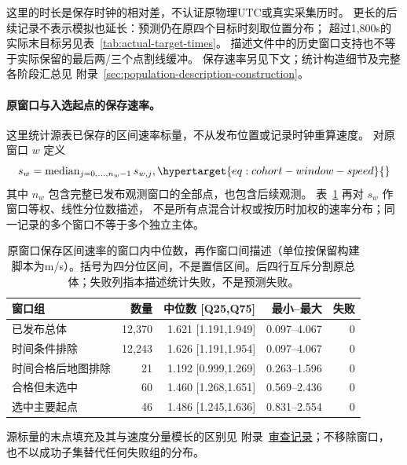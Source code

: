这里的时长是保存时钟的相对差，不认证原物理UTC或真实采集历时。
更长的后续记录不表示模拟也延长：预测仍在原四个目标时刻取位置分布；
超过1,800s的实际末目标另见表~\ref{tab:actual-target-times}。
描述文件中的历史窗口支持也不等于实际保留的最后两/三个点割线缓冲。
保存速率另见下文；统计构造细节及完整各阶段汇总见
附录~\ref{sec:population-description-construction}。

\paragraph{原窗口与入选起点的保存速率。}\label{sec:final-cohort-speeds}\hypertarget{sec:final-cohort-speeds}{}
这里统计源表已保存的区间速率标量，不从发布位置或记录时钟重算速度。
对原窗口 $w$ 定义
\begin{equation}
 s_w=\operatorname{median}_{j=0,\ldots,n_w-1}s_{w,j},
 \label{eq:cohort-window-speed}\hypertarget{eq:cohort-window-speed}{}
\end{equation}
其中 $n_w$ 包含完整已发布观测窗口的全部点，也包含后续观测。
表~\ref{tab:final-cohort-speeds} 再对 $s_w$ 作窗口等权、线性分位数描述，
不是所有点混合计权或按历时加权的速率分布；同一记录的多个窗口不等于多个独立主体。

\begin{table}[htbp]
\centering\small
\caption{原窗口保存区间速率的窗口内中位数，再作窗口间描述（单位按保留构建脚本为m/s）。括号为四分位区间，不是置信区间。后四行互斥分割原总体；失败列指本描述统计失败，不是预测失败。}
\label{tab:final-cohort-speeds}\hypertarget{tab:final-cohort-speeds}{}
\begin{tabular}{@{}lrrrr@{}}
\toprule
窗口组 & 数量 & 中位数 [Q25,Q75] & 最小--最大 & 失败\\
\midrule
已发布总体 & 12,370 & 1.621 [1.191,1.949] & 0.097--4.067 & 0\\
时间条件排除 & 12,243 & 1.626 [1.191,1.954] & 0.097--4.067 & 0\\
时间合格后地图排除 & 21 & 1.192 [0.999,1.269] & 0.263--1.596 & 0\\
合格但未选中 & 60 & 1.460 [1.268,1.651] & 0.569--2.436 & 0\\
选中主要起点 & 46 & 1.486 [1.245,1.636] & 0.831--2.554 & 0\\
\bottomrule
\end{tabular}
\end{table}

源标量的末点填充及其与速度分量模长的区别见
附录~\href{audit-notes.pdf\#sec:source-reconciliation-details}{审查记录}；不移除窗口，
也不以成功子集替代任何失败组的分布。

